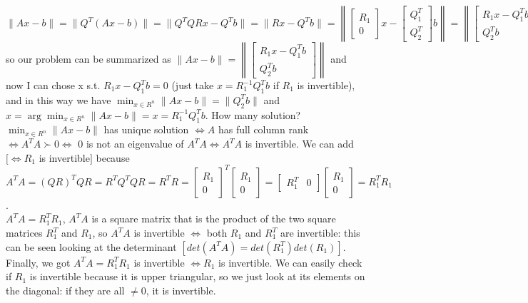 \documentclass{article}
\begin{document}
$\|Ax - b\| = \|Q^{T}(Ax-b)\| =
\|Q^{T}QRx - Q^{T}b\| =
\|Rx - Q^{T}b\| =
\left\lVert\begin{bmatrix}R_{1} \\ 0\end{bmatrix}x - \begin{bmatrix}Q_{1}^T \\ Q_{2}^T\end{bmatrix}b\right\rVert =
\left\lVert\begin{bmatrix}R_{1}x - Q_{1}^{T}b \\ Q_{2}^{T}b\end{bmatrix}\right\rVert$
so our problem can be summarized as
$\|Ax - b\| =
\left\lVert \begin{bmatrix} R_{1}x - Q_{1}^{T}b \\ Q_{2}^{T}b\end{bmatrix} \right\lVert$
and now I can chose x s.t. $R_{1}x - Q_{1}^{T}b = 0$ (just take $x = R_{1}^{-1}Q_{1}^{T}b$ if $R_{1}$ is invertible), and in this way we have $\min_{x \in R^n}\|Ax - b\| = \|Q_{2}^{T}b\|$ and $x  = \arg\!\min_{x \in R^n}\|Ax - b\| = x = R_{1}^{-1}Q_{1}^{T}b$.
How many solution?
$\min_{x \in R^n}\|Ax - b\|$ has unique solution $\iff A$ has full column rank $\iff A^{T}A \succ 0 \iff$ 0 is not an eigenvalue of $A^{T}A \iff A^{T}A$ is invertible. We can add $[\iff R_{1}$ is invertible$]$ because $A^{T}A = (QR)^{T}QR = R^{T}Q^{T}QR = R^{T}R = \begin{bmatrix} R_{1} \\ 0 \end{bmatrix}^{T} \begin{bmatrix} R_{1} \\ 0 \end{bmatrix} = \begin{bmatrix} R_{1}^{T} & 0 \end{bmatrix} \begin{bmatrix} R_{1} \\ 0 \end{bmatrix} = R_{1}^{T}R_{1}$.
\\ $A^{T}A = R_{1}^{T}R_{1}$, $A^{T}A$ is a square matrix that is the product of the two square matrices $R_{1}^{T}$ and $R_{1}$, so $A^{T}A$ is invertible $\iff$ both $R_{1}$ and $R_{1}^{T}$ are invertible: this can be seen looking at the determinant $[ det(A^{T}A) = det(R_{1}^{T}) det(R_{1}) ]$.
Finally, we got $A^{T}A = R_{1}^{T}R_{1}$ is invertible $\iff R_{1}$ is invertible. We can easily check if $R_{1}$ is invertible because it is upper triangular, so we just look at its elements on the diagonal: if they are all $\neq 0$, it is invertible.
\end{document}
